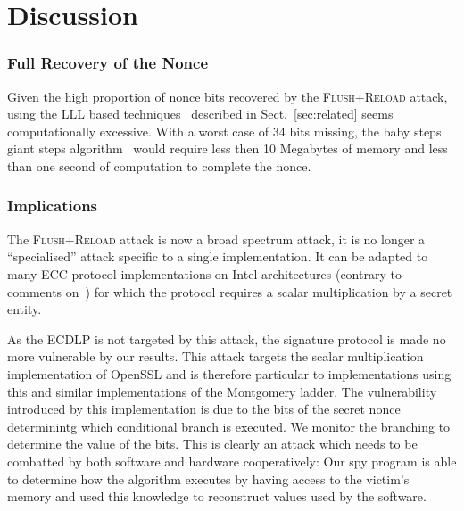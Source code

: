 \documentclass[twocolumn]{svjour3}
\begin{document}
\section{Discussion}\label{sec:discussion}

\subsubsection*{Full Recovery of the Nonce}\label{sub:full_nonce}
Given the high proportion of nonce bits recovered by the \textsc{Flush+Reload} attack, using the LLL based techniques~\cite{Howgrave-GrahamS01,nguyen03insecurity} described in Sect.~\ref{sec:related} seems computationally excessive. 
With a worst case of 34 bits missing, the baby steps giant steps algorithm~\cite{shanks71class} would require less then 10 Megabytes of memory
and less than one second of computation to complete the nonce.


\subsubsection*{Implications}
The \textsc{Flush+Reload} attack is now a broad spectrum attack, it is no longer a ``specialised'' attack specific to a single implementation. It can be adapted to many ECC protocol implementations on Intel architectures (contrary to comments on~\cite{cert}) for which the protocol requires a scalar multiplication by a secret entity.

As the ECDLP is not targeted by this attack, the signature protocol is made no more vulnerable by our results. 
This attack targets the scalar multiplication implementation of OpenSSL and is therefore particular to implementations using this and similar implementations of the Montgomery ladder. The vulnerability introduced by this implementation is due to the bits of the secret nonce determinintg which conditional branch is executed. We monitor the branching to determine the value of the bits. This is clearly an attack which needs to be combatted by both software and hardware cooperatively: Our spy program is able to determine how the algorithm executes by having access to the victim's memory and used this knowledge to reconstruct values used by the software.
\end{document}
